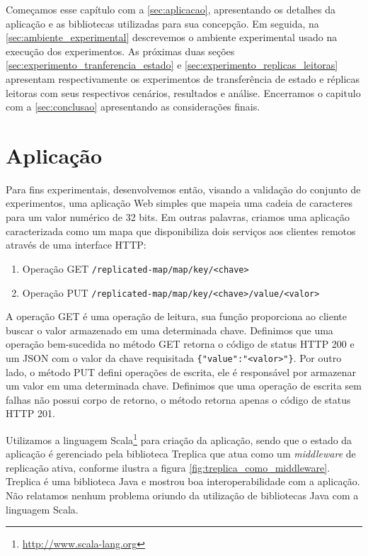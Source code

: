 Começamos esse capítulo com a \autoref{sec:aplicacao}, apresentando os detalhes da
aplicação e as bibliotecas utilizadas para sua concepção. Em seguida, na
\autoref{sec:ambiente_experimental} descrevemos o ambiente experimental usado na execução
dos experimentos. As próximas duas seções \autoref{sec:experimento_tranferencia_estado} e
\autoref{sec:experimento_replicas_leitoras} apresentam respectivamente os experimentos de
transferência de estado e réplicas leitoras com seus respectivos cenários, resultados e
análise. Encerramos o capitulo com a \autoref{sec:conclusao} apresentando as considerações
finais.


\section{Aplicação}\label{sec:aplicacao}

Para fins experimentais, desenvolvemos então, visando a validação do conjunto de
experimentos, uma aplicação Web simples que mapeia uma cadeia de caracteres para um valor
numérico de 32 bits. Em outras palavras, criamos uma aplicação caracterizada como um mapa
que disponibiliza dois serviços aos clientes remotos através de uma interface HTTP:

\begin{enumerate}
  \item Operação GET \verb|/replicated-map/map/key/<chave>|
  \item Operação PUT \verb|/replicated-map/map/key/<chave>/value/<valor>|
\end{enumerate}

A operação GET é uma operação de leitura, sua função proporciona ao cliente buscar o valor
armazenado em uma determinada chave. Definimos que uma operação bem-sucedida no método GET
retorna o código de status HTTP 200 e um JSON com o valor da chave requisitada
\verb|{"value":"<valor>"}|. Por outro lado, o método PUT defini operações de escrita, ele
é responsável por armazenar um valor em uma determinada chave. Definimos que uma operação
de escrita sem falhas não possui corpo de retorno, o método retorna apenas o código de
status HTTP 201.

Utilizamos a linguagem Scala\footnote{\url{http://www.scala-lang.org}} para criação da
aplicação, sendo que o estado da aplicação é gerenciado pela biblioteca Treplica que atua
como um \emph{middleware} de replicação ativa, conforme ilustra a figura
\autoref{fig:treplica_como_middleware}. Treplica é uma biblioteca Java e mostrou boa
interoperabilidade com a aplicação. Não relatamos nenhum problema oriundo da utilização de
bibliotecas Java com a linguagem Scala.

